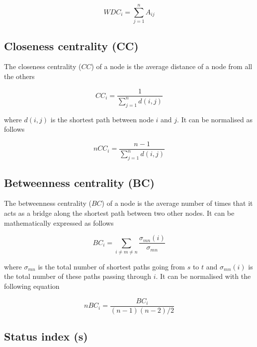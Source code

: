 \documentclass[twocolumn]{article}
\begin{document}
					\begin{equation}
								WDC_i=\sum_{j=1}^{n}A_{ij}
					\end{equation}

	\subsection*{Closeness centrality (CC)}

		The closeness centrality ($CC$) of a node is the average distance of a node from all the others \citep{Wasserman1994}

					\begin{equation}
								CC_i=\frac{1}{\sum\limits_{j=1}^n d(i,j)}
					\end{equation}

		\noindent where $d(i,j)$ is the shortest path between node $i$ and $j$. It can be normalised as follows \citep{Wasserman1994}

					\begin{equation}
								nCC_i=\frac{n-1}{\sum\limits_{j=1}^n d(i,j)}
					\end{equation}

	\subsection*{Betweenness centrality (BC)}

		The betweenness centrality ($BC$) of a node is the average number of times that it acts as a bridge along the shortest path between two other nodes. It can be  mathematically expressed as follows \citep{Wasserman1994}

						\begin{equation}
							BC_i=\sum_{i\neq m\neq n}\frac{\sigma_{mn}\left(i\right)}{\sigma_{mn}}
						\end{equation}

		\noindent where $\sigma_{mn}$ is the total number of shortest paths going from $s$ to $t$ and $\sigma_{mn}\left(i\right)$ is the total number of these paths passing through $i$. It can be normalised with the following equation \citep{Wasserman1994}

						\begin{equation}
							nBC_i=\frac{BC_i}{\left(n-1\right)\left(n-2\right)/2}
						\end{equation}

	\subsection*{Status index (s)}
\end{document}
